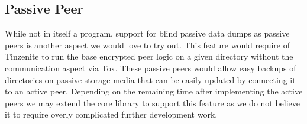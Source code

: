 \subsection{Passive Peer}

While not in itself a program, support for blind passive data dumps as passive peers is another aspect we would love to try out.
This feature would require of Tinzenite to run the base encrypted peer logic on a given directory without the communication aspect via Tox.
These passive peers would allow easy backups of directories on passive storage media that can be easily updated by connecting it to an active peer.
Depending on the remaining time after implementing the active peers we may extend the core library to support this feature as we do not believe it to require overly complicated further development work.
